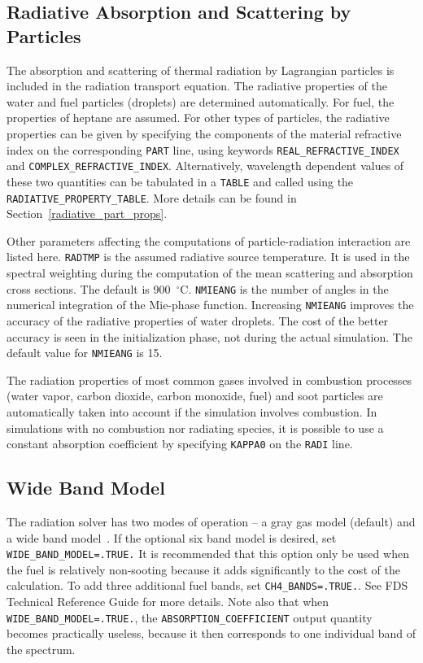 \documentclass[11pt]{book}
\newcommand{\ct}{\tt\small}
\begin{document}
\subsection{Radiative Absorption and Scattering by Particles}

\label{info:RADI_Absorption}

The absorption and scattering of thermal radiation by Lagrangian particles is included in the radiation transport equation. The radiative properties of
the water and fuel particles (droplets) are determined automatically. For fuel, the properties of heptane are assumed. For other types of particles, the
radiative properties can be given by specifying the components of the material refractive index on the corresponding {\ct PART} line, using keywords
{\ct REAL\_REFRACTIVE\_INDEX} and {\ct COMPLEX\_REFRACTIVE\_INDEX}. Alternatively, wavelength dependent values of these two
quantities can be tabulated in a {\ct TABLE} and called using the {\ct RADIATIVE\_PROPERTY\_TABLE}. More details can be found in Section~\ref{radiative_part_props}.

Other parameters affecting the computations of particle-radiation interaction are listed here. {\ct RADTMP} is the assumed radiative source temperature.
It is used in the spectral weighting during the computation of the mean scattering and absorption cross sections. The default is 900~$^\circ$C.
{\ct NMIEANG} is the number of angles in the numerical integration of the Mie-phase function.
Increasing {\ct NMIEANG} improves the accuracy of the radiative properties of water droplets. The cost
of the better accuracy is seen in the initialization phase, not during the actual simulation. The default value for {\ct NMIEANG}
is 15.

The radiation properties of most common gases involved in combustion processes (water vapor, carbon dioxide, carbon monoxide, fuel) and
soot particles are automatically taken into account if the simulation involves combustion. In simulations with no combustion nor radiating species, it is
possible to use a constant absorption coefficient by specifying {\ct KAPPA0} on the {\ct RADI} line.


\subsection{Wide Band Model}

\label{info:RADI_Wide_Band}

The radiation solver has two modes of
operation -- a gray gas model (default) and a wide band model~\cite{FDS_Math_Guide}.
If the optional six band model is desired,
set {\ct WIDE\_BAND\_MODEL=.TRUE.} It is recommended that this option
only be used when the fuel is relatively non-sooting because it
adds significantly to the cost of the calculation. To add three
additional fuel bands, set {\ct CH4\_BANDS=.TRUE.}. See FDS Technical
Reference Guide for more details. Note also that when
{\ct WIDE\_BAND\_MODEL=.TRUE.}, the {\ct ABSORPTION\_COEFFICIENT}
output quantity becomes practically useless, because it then
corresponds to one individual band of the spectrum.
\end{document}
